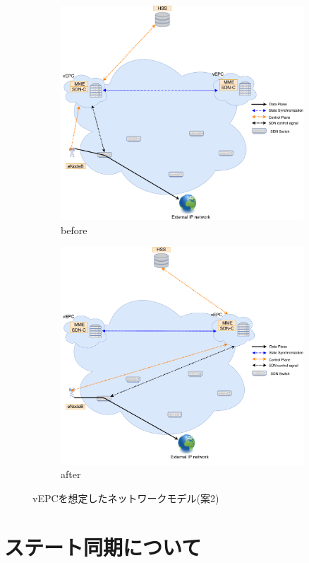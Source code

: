 \documentclass[a4j]{ujarticle}
\begin{document}
\begin{figure}[p]
	\centering
		\begin{subfigure}{1.0\textwidth}
		\centering
			\includegraphics[width=0.5\hsize]{vEPC_SDN_before.pdf}
			\caption{before}
			\label{vEPC_SDN_before}
		\end{subfigure}
		\begin{subfigure}{1.0\textwidth}
		\centering
			\includegraphics[width=0.5\hsize]{vEPC_SDN_after.pdf}
			\caption{after}
			\label{vEPC_SDN_after}
		\end{subfigure}
		\caption{vEPCを想定したネットワークモデル(案2)}
		\label{vEPC_SDN}
\end{figure}

%

\clearpage


\section{ステート同期について}
\end{document}
